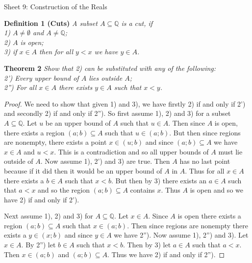 \documentclass{article}
\begin{document}
\begin{flushleft}

\Large

Sheet 9: Construction of the Reals\newline

\normalsize

\textbf{Definition 1 (Cuts)}
\textsl{A subset $A \subseteq \mathbb{Q}$ is a cut, if\\
1) $A \neq \emptyset$ and $A \neq \mathbb{Q}$;\\
2) $A$ is open;\\
3) if $x \in A$ then for all $y<x$ we have $y \in A$.}
\newline

\textbf{Theorem 2}
\textsl{Show that 2) can be substituted with any of the following:\\
2') Every upper bound of $A$ lies outside $A$;\\
2'') For all $x \in A$ there exists $y \in A$ such that $x < y$.}
\begin{proof}
We need to show that given 1) and 3), we have firstly 2) if and only if 2') and secondly 2) if and only if 2''). So first assume 1), 2) and 3) for a subset $A \subseteq \mathbb{Q}$. Let $u$ be an upper bound of $A$ such that $u \in A$. Then since $A$ is open, there exists a region $(a;b) \subseteq A$ such that $u \in (a;b)$. But then since regions are nonempty, there exists a point $x \in (u;b)$ and since $(a;b) \subseteq A$ we have $x \in A$ and $u<x$. This is a contradiction and so all upper bounds of $A$ must lie outside of $A$. Now assume 1), 2') and 3) are true. Then $A$ has no last point because if it did then it would be an upper bound of $A$ in $A$. Thus for all $x \in A$ there exists a $b \in A$ such that $x<b$. But then by 3) there exists an $a \in A$ such that $a<x$ and so the region $(a;b) \subseteq A$ contains $x$. Thus $A$ is open and so we have 2) if and only if 2').\newline

Next assume 1), 2) and 3) for $A \subseteq \mathbb{Q}$. Let $x \in A$. Since $A$ is open there exists a region $(a;b) \subseteq A$ such that $x \in (a;b)$. Then since regions are nonempty there exists a $y \in (x;b)$ and since $y \in A$ we have 2''). Now assume 1), 2'') and 3). Let $x \in A$. By 2'') let $b \in A$ such that $x<b$. Then by 3) let $a \in A$ such that $a<x$. Then $x \in (a;b)$ and $(a;b) \subseteq A$. Thus we have 2) if and only if 2'').
\end{proof}


\end{flushleft}
\end{document}
